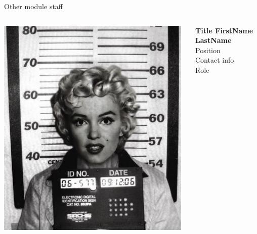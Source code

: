 
\begin{frame}{Other module staff}

\begin{columns}
  \begin{column}{0.20\textwidth}
   \begin{center}
     \includegraphics[width=0.98\textwidth]{./images/people/placeholder_f}\\
   \end{center}
  \end{column}
  \begin{column}{0.80\textwidth}
    {\bf Title FirstName LastName} \\
    Position\\
    Contact info\\
    Role\\
  \end{column}
\end{columns}


\end{frame}
